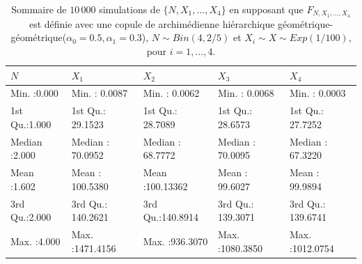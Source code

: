 \documentclass{article}
\begin{document}
		\begin{table}[H]
			\centering
			\begin{tabular}{lllll}
				\hline
				$N$ &       $X_1$ &       $X_2$    &  $X_3$ &       $X_4$  \\ 
				\hline
				  Min.   :0.000   & Min.   :   0.0087   & Min.   :  0.0062  & Min.   :   0.0068   & Min.   :   0.0003    \\ 
				  1st Qu.:1.000   & 1st Qu.:  29.1523   & 1st Qu.: 28.7089  & 1st Qu.:  28.6573   & 1st Qu.:  27.7252     \\ 
				  Median :2.000   & Median :  70.0952   & Median : 68.7772  & Median :  70.0095   & Median :  67.3220  \\ 
				  Mean   :1.602   & Mean   : 100.5380   & Mean   :100.13362 & Mean   :  99.6027   & Mean   :  99.9894     \\ 
				  3rd Qu.:2.000   & 3rd Qu.: 140.2621   & 3rd Qu.:140.8914  & 3rd Qu.: 139.3071   & 3rd Qu.: 139.6741    \\ 
				  Max.   :4.000   & Max.   :1471.4156   & Max.   :936.3070  & Max.   :1080.3850   & Max.   :1012.0754 \\ 
				\hline
			\end{tabular}
			\caption[Sommaire des données simulées pour le scénario \ref{scenario_geo_geo}]{Sommaire de $10\,000$ simulations de $\{N, X_1, \dots, X_4\}$ en supposant que $F_{N,X_1,\dots, X_4}$ est définie avec une copule de archimédienne hiérarchique géométrique-géométrique($\alpha_0=0.5, \alpha_1 = 0.3$), $N \sim Bin(4, 2/5)$ et $X_i \sim X \sim Exp(1/100)$, pour $i=1,\dots, 4$.}
			\label{tbl_sommaire_geo_geo}
		\end{table}
		
\end{document}
